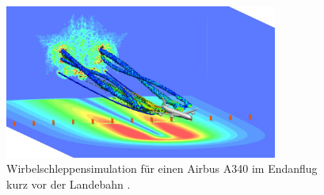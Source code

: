 \begin{figure}
\centering
\includegraphics[width=0.8\textwidth]{papers/wirbelringe/fig/wirbelschleppen_in_der_simulation.jpg}
\caption{Wirbelschleppensimulation für einen Airbus A340 im Endanflug kurz vor der Landebahn
\cite{Wirbelringe:wirbelschleppen_in_der_simulation}. \label{Wirbelringe:fig:wirbelschleppen_in_der_simulation}}
\end{figure}